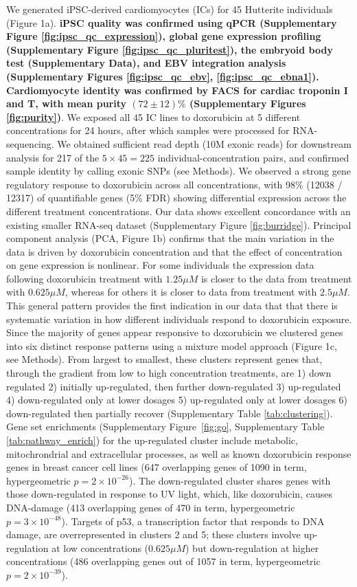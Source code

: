 \documentclass{article}
\newcommand{\tempbold}[1]{\textbf{#1}}
\begin{document}
We generated iPSC-derived cardiomyocytes (ICs) for 45 Hutterite individuals (Figure 1a). \tempbold{iPSC quality was confirmed using qPCR (Supplementary Figure \ref{fig:ipsc_qc_expression}), global gene expression profiling (Supplementary Figure \ref{fig:ipsc_qc_pluritest}), the embryoid body test (Supplementary Data), and EBV integration analysis (Supplementary Figures \ref{fig:ipsc_qc_ebv}, \ref{fig:ipsc_qc_ebna1}). Cardiomyocyte identity was confirmed by FACS for cardiac troponin I and T, with mean purity $(72 \pm 12)\%$ (Supplementary Figures \ref{fig:purity})}. We exposed all 45 IC lines to doxorubicin at 5 different concentrations for 24 hours, after which samples were processed for RNA-sequencing. We obtained sufficient read depth (10M exonic reads) for downstream analysis for 217 of the $5 \times 45 = 225$ individual-concentration pairs, and confirmed sample identity by calling exonic SNPs (see Methods). We observed a strong gene regulatory response to doxorubicin across all concentrations, with 98\% (12038 / 12317) of quantifiable genes (5\% FDR) showing differential expression across the different treatment concentrations. Our data shows excellent concordance with an existing smaller RNA-seq dataset\cite{Burridge2016} (Supplementary Figure \ref{fig:burridge}). Principal component analysis (PCA, Figure 1b) confirms that the main variation in the data is driven by doxorubicin concentration and that the effect of concentration on gene expression is nonlinear. For some individuals the expression data following doxorubicin treatment with $1.25\mu M$ is closer to the data from treatment with $0.625 \mu M$, whereas for others it is closer to data from treatment with $2.5\mu M$. This general pattern provides the first indication in our data that that there is systematic variation in how different individuals respond to doxorubicin exposure. Since the majority of genes appear responsive to doxorubicin we clustered genes into six distinct response patterns using a mixture model approach (Figure 1c, see Methods). From largest to smallest, these clusters represent genes that, through the gradient from low to high concentration treatments, are  1) down regulated 2) initially up-regulated, then further down-regulated 3) up-regulated 4) down-regulated only at lower dosages 5) up-regulated only at lower dosages 6) down-regulated then partially recover (Supplementary Table \ref{tab:clustering}). Gene set enrichments (Supplementary Figure~\ref{fig:go}, Supplementary Table \ref{tab:pathway_enrich}) for the up-regulated cluster include metabolic, mitochrondrial and extracellular processes, as well as known doxorubicin response genes in breast cancer cell lines \cite{graessmann2007chemotherapy} (647 overlapping genes of 1090 in term, hypergeometric $p=2 \times 10^{-26}$). The down-regulated cluster shares genes with those down-regulated in response to UV light, which, like doxorubicin, causes DNA-damage (413 overlapping genes of 470 in term, hypergeometric $p=3 \times 10^{-48}$). Targets of p53, a transcription factor that responds to DNA damage, are overrepresented in clusters 2 and 5; these clusters involve up-regulation at low concentrations ($0.625\mu M$) but down-regulation at higher concentrations (486 overlapping genes out of 1057 in term, hypergeometric $p=2 \times 10^{-39}$). 
\end{document}
